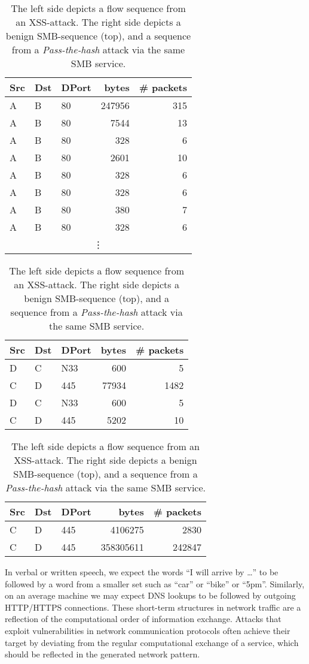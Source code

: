 \begin{table}[ht]
\centering
\begin{footnotesize}
\begin{subtable}{.47\textwidth}
\begin{tabular}{l l l r r}
Src&Dst&DPort&bytes&\# packets\\ \hline
A&B&80&247956&315\\ 
A&B&80&7544&13\\ 
A&B&80&328&6\\ 
A&B&80&2601&10\\ 
A&B&80&328&6\\ 
A&B&80&328&6\\ 
A&B&80&380&7\\
A&B&80&328&6\\
\multicolumn{5}{c}{\vdots}
\end{tabular}
\caption{XSS-attack, A=192.168.10.50, B= 172.16.0.1}\label{Tab:XSS}
\end{subtable}
\quad
\begin{subtable}{.47\textwidth}
\begin{tabular}{l l l r r}
Src&Dst&DPort&bytes&\# packets\\ \hline
D&C&N33&600&5\\ 
C&D&445&77934&1482\\ 
D&C&N33&600&5\\ 
C&D&445&5202&10\\  
\end{tabular}
\caption{Benign SMB, C=C6267, D=C754}\label{Tab:SMB}

\begin{tabular}{l l l r r}
Src&Dst&DPort&bytes&\# packets\\ \hline
C&D&445&4106275&2830\\ 
C&D&445&358305611&242847\\ 
\end{tabular}
\caption{\textit{Pass-the-hash} attack via SMB}\label{Tab:PTH}
\end{subtable}
\end{footnotesize}
\caption{The left side depicts a flow sequence from an XSS-attack.%
The right side depicts a benign SMB-sequence (top), and a sequence from a \textit{Pass-the-hash} attack via the same SMB service.}
\end{table}


In verbal or written speech, we expect the words ``I will arrive by \dots'' to be followed by a word from a smaller set such as ``car'' or ``bike'' or ``5pm''. 
Similarly, on an average machine we may expect DNS lookups 
to be followed by outgoing HTTP/HTTPS connections. %
These short-term structures in network traffic are a reflection of the computational order of information exchange. Attacks that exploit vulnerabilities in network communication protocols often achieve their target by deviating from the regular computational exchange of a service, which should be reflected in the generated network pattern. 


